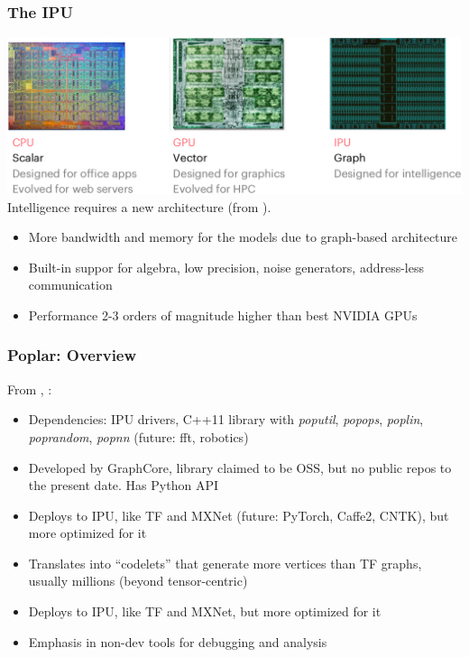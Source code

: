 \documentclass[hyperref={pdfpagelabels=false}]{beamer}
\begin{document}
        \begin{frame}
       \frametitle{The IPU}
       \vspace{-6mm}
        \begin{center}
          \includegraphics[scale=0.32]{cpu_gpu_ipu.png}
          \scriptsize{\\Intelligence requires a new architecture (from \cite{ipu-nips}).}
        \end{center}
        \begin{itemize}
        \item More bandwidth and memory for the models due to graph-based architecture
        \item Built-in suppor for algebra, low precision, noise generators, address-less communication
        \item Performance 2-3 orders of magnitude higher than best NVIDIA GPUs\cite{ipu-benchmarks}
       \end{itemize}
     \end{frame}

     \begin{frame}
       \frametitle{Poplar: Overview}
       From \cite{poplar-overview}, \cite{poplar-nips}:
       \begin{itemize}
       \item Dependencies: IPU drivers, C++11 library with \textit{poputil}, \textit{popops}, \textit{poplin}, \textit{poprandom}, \textit{popnn} (future: fft, robotics)
       \item Developed by GraphCore, library claimed to be OSS, but no public repos to the present date. Has Python API
       \item Deploys to IPU, like TF and MXNet (future: PyTorch, Caffe2, CNTK), but more optimized for it
       \item Translates into ``codelets'' that generate more vertices than TF graphs, usually millions (beyond tensor-centric)
       \item Deploys to IPU, like TF and MXNet, but more optimized for it
       \item Emphasis in non-dev tools for debugging and analysis
       \end{itemize}
     \end{frame}
\end{document}
